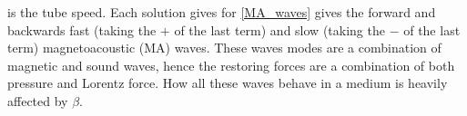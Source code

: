 \documentclass[12pt]{ociamthesis}
\newcommand{\bs}[1]{\boldsymbol{#1}}
\newcommand{\eref}[1]{Eq. \eqref{#1}}
\begin{document}
is the tube speed. Each solution gives for \eqref{MA_waves} gives the forward and backwards fast (taking the $+$ of the last term) and slow (taking the $-$ of the last term) magnetoacoustic (MA) waves. These waves modes are a combination of magnetic and sound waves, hence the restoring forces are a combination of both pressure and Lorentz force. How all these waves behave in a medium is heavily affected by $\beta$.
\end{document}
